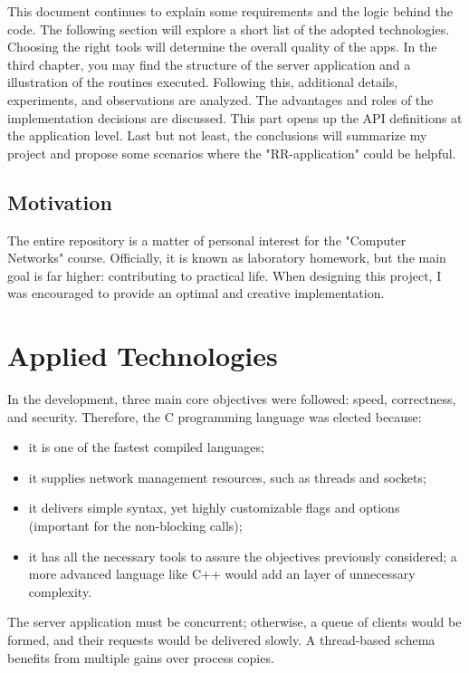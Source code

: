 \documentclass[runningheads]{llncs}
\begin{document}
This document continues to explain some requirements and the logic behind the code. The following section will explore a short list of the adopted technologies. Choosing the right tools will determine the overall quality of the apps. In the third chapter, you may find the structure of the server application and a illustration of the routines executed. Following this, additional details, experiments, and observations are analyzed. The advantages and roles of the implementation decisions are discussed. This part opens up the API definitions at the application level. Last but not least, the conclusions will summarize my project and propose some scenarios where the "RR-application" could be helpful.

\subsection{Motivation}

The entire repository is a matter of personal interest for the "Computer Networks" course. Officially, it is known as laboratory homework, but the main goal is far higher: contributing to practical life. When designing this project, I was encouraged to provide an optimal and creative implementation.

\section{Applied Technologies}

In the development, three main core objectives were followed: speed, correctness, and security. Therefore, the C programming language was elected because:
\begin{itemize}
  \item it is one of the fastest compiled languages;
  \item it supplies network management resources, such as threads and sockets;
  \item it delivers simple syntax, yet highly customizable flags and options (important for the non-blocking calls);
  \item it has all the necessary tools to assure the objectives previously considered; a more advanced language like C++ would add an layer of unnecessary complexity.
\end{itemize}

The server application must be concurrent; otherwise, a queue of clients would be formed, and their requests would be delivered slowly. A thread-based schema benefits from multiple gains over process copies.
\end{document}
